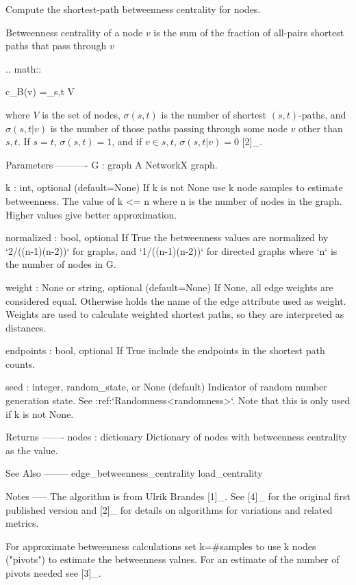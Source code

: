 \begin{DoxyVerb}Compute the shortest-path betweenness centrality for nodes.

Betweenness centrality of a node $v$ is the sum of the
fraction of all-pairs shortest paths that pass through $v$

.. math::

   c_B(v) =\sum_{s,t \in V} 

where $V$ is the set of nodes, $\sigma(s, t)$ is the number of
shortest $(s, t)$-paths,  and $\sigma(s, t|v)$ is the number of
those paths  passing through some  node $v$ other than $s, t$.
If $s = t$, $\sigma(s, t) = 1$, and if $v \in {s, t}$,
$\sigma(s, t|v) = 0$ [2]_.

Parameters
----------
G : graph
  A NetworkX graph.

k : int, optional (default=None)
  If k is not None use k node samples to estimate betweenness.
  The value of k <= n where n is the number of nodes in the graph.
  Higher values give better approximation.

normalized : bool, optional
  If True the betweenness values are normalized by `2/((n-1)(n-2))`
  for graphs, and `1/((n-1)(n-2))` for directed graphs where `n`
  is the number of nodes in G.

weight : None or string, optional (default=None)
  If None, all edge weights are considered equal.
  Otherwise holds the name of the edge attribute used as weight.
  Weights are used to calculate weighted shortest paths, so they are
  interpreted as distances.

endpoints : bool, optional
  If True include the endpoints in the shortest path counts.

seed : integer, random_state, or None (default)
    Indicator of random number generation state.
    See :ref:`Randomness<randomness>`.
    Note that this is only used if k is not None.

Returns
-------
nodes : dictionary
   Dictionary of nodes with betweenness centrality as the value.

See Also
--------
edge_betweenness_centrality
load_centrality

Notes
-----
The algorithm is from Ulrik Brandes [1]_.
See [4]_ for the original first published version and [2]_ for details on
algorithms for variations and related metrics.

For approximate betweenness calculations set k=#samples to use
k nodes ("pivots") to estimate the betweenness values. For an estimate
of the number of pivots needed see [3]_.


\end{DoxyVerb}
